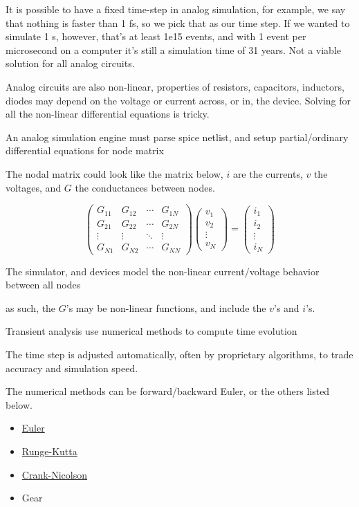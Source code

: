 It is possible to have a fixed time-step in analog simulation, for
example, we say that nothing is faster than 1 fs, so we pick that as our
time step. If we wanted to simulate 1 s, however, that's at least 1e15
events, and with 1 event per microsecond on a computer it's still a
simulation time of 31 years. Not a viable solution for all analog
circuits.

Analog circuits are also non-linear, properties of resistors,
capacitors, inductors, diodes may depend on the voltage or current
across, or in, the device. Solving for all the non-linear differential
equations is tricky.

An analog simulation engine must parse spice netlist, and setup
partial/ordinary differential equations for node matrix

The nodal matrix could look like the matrix below, \(i\) are the
currents, \(v\) the voltages, and \(G\) the conductances between nodes.

\[
\begin{pmatrix}
G_{11} &G_{12}  &\cdots  &G_{1N} \\ 
G_{21} &G_{22}  &\cdots  &G_{2N} \\ 
\vdots &\vdots  &\ddots  & \vdots\\ 
G_{N1} &G_{N2}  &\cdots  &G_{NN} 
\end{pmatrix}
\begin{pmatrix}
v_1\\ 
v_2\\ 
\vdots\\ 
v_N
\end{pmatrix}=
\begin{pmatrix}
i_1\\ 
i_2\\ 
\vdots\\ 
i_N
\end{pmatrix}
\]

The simulator, and devices model the non-linear current/voltage behavior
between all nodes

as such, the \(G\)'s may be non-linear functions, and include the
\(v\)'s and \(i\)'s.

Transient analysis use numerical methods to compute time evolution

The time step is adjusted automatically, often by proprietary
algorithms, to trade accuracy and simulation speed.

The numerical methods can be forward/backward Euler, or the others
listed below.

\begin{itemize}
\tightlist
\item
  \href{https://aquaulb.github.io/book_solving_pde_mooc/solving_pde_mooc/notebooks/02_TimeIntegration/02_01_EulerMethod.html}{Euler}
\item
  \href{https://aquaulb.github.io/book_solving_pde_mooc/solving_pde_mooc/notebooks/02_TimeIntegration/02_02_RungeKutta.html}{Runge-Kutta}
\item
  \href{https://en.wikipedia.org/wiki/Crank\%E2\%80\%93Nicolson_method}{Crank-Nicolson}
\item
  Gear 
\end{itemize}

